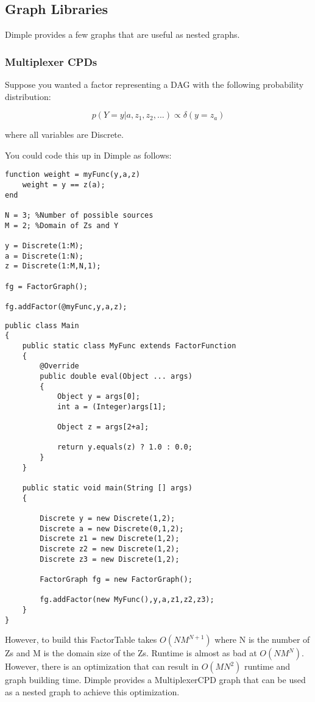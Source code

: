 \subsection{Graph Libraries}

Dimple provides a few graphs that are useful as nested graphs.

\subsubsection{Multiplexer CPDs}
\label{sec:multiplexerCPD}

Suppose you wanted a factor representing a DAG with the following probability distribution:

\[
p(Y=y|a,z_1,z_2,...) \propto \delta(y = z_a)
\]

where all variables are Discrete.

You could code this up in Dimple as follows:

\ifmatlab
\begin{lstlisting}
function weight = myFunc(y,a,z)
    weight = y == z(a);
end

N = 3; %Number of possible sources
M = 2; %Domain of Zs and Y

y = Discrete(1:M);
a = Discrete(1:N);
z = Discrete(1:M,N,1);
 
fg = FactorGraph();
 
fg.addFactor(@myFunc,y,a,z);
\end{lstlisting}
\fi

\ifjava
\begin{lstlisting}
public class Main 
{		
	public static class MyFunc extends FactorFunction
	{
		@Override
		public double eval(Object ... args)
		{
			Object y = args[0];
			int a = (Integer)args[1];
			
			Object z = args[2+a];
			
			return y.equals(z) ? 1.0 : 0.0;
		}
	}
	
	public static void main(String [] args)
	{
		
		Discrete y = new Discrete(1,2);
		Discrete a = new Discrete(0,1,2);
		Discrete z1 = new Discrete(1,2);
		Discrete z2 = new Discrete(1,2);
		Discrete z3 = new Discrete(1,2);
		 
		FactorGraph fg = new FactorGraph();
		 
		fg.addFactor(new MyFunc(),y,a,z1,z2,z3);
	}
}
\end{lstlisting}
\fi

However, to build this FactorTable takes $O(NM^{N+1})$ where N is the number of Zs and M is the domain size of the Zs.  Runtime is almost as bad at $O(NM^N)$.  However, there is an optimization that can result in $O(MN^2)$ runtime and graph building time.  Dimple provides a MultiplexerCPD graph that can be used as a nested graph to achieve this optimization.

